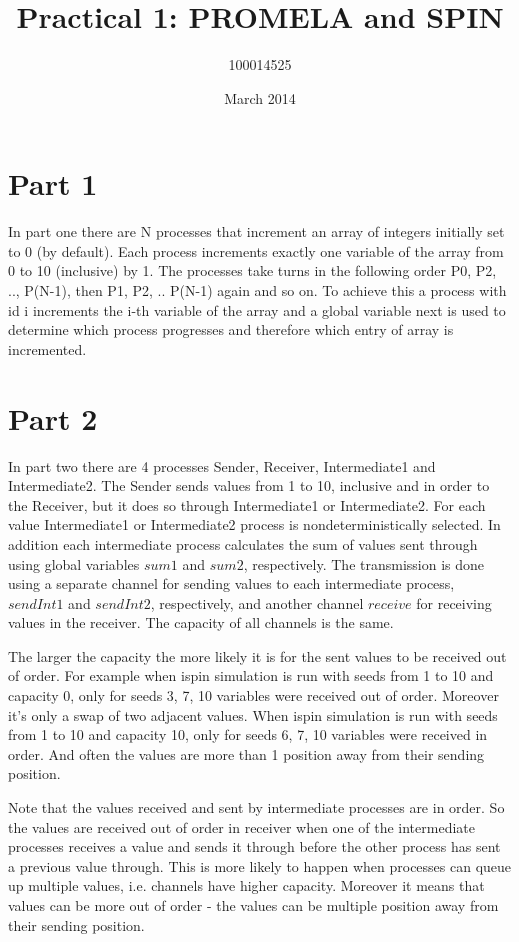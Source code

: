 \documentclass{article}
\title{Practical 1: PROMELA and SPIN}
\author{100014525}
\date{March 2014}
\begin{document}
\maketitle

\section*{Part 1}

In part one there are N processes that increment an array of integers initially set to 0 (by default). Each process increments exactly one variable of the array from 0 to 10 (inclusive) by 1. The processes take turns in the following order P0, P2, .., P(N-1), then P1, P2, .. P(N-1) again and so on. To achieve this a process with id i increments the i-th variable of the array and a global variable next is used to 
determine which process progresses and therefore which entry of array is incremented.

\section*{Part 2}

In part two there are 4 processes Sender, Receiver, Intermediate1 and Intermediate2. The Sender sends values from 1 to 10, inclusive and in order to the Receiver, but it does so through Intermediate1 or Intermediate2. For each value Intermediate1 or Intermediate2 process is nondeterministically selected. In addition each intermediate process calculates the sum of values sent through using global variables $sum1$ and $sum2$, respectively. The transmission is done using a separate channel for sending values to each intermediate process, $sendInt1$ and $sendInt2$, respectively, and another channel $receive$ for receiving values in the receiver. The capacity of all channels is the same.

The larger the capacity the more likely it is for the sent values to be received out of order. For example when ispin simulation is run with seeds from 1 to 10 and capacity 0, only for seeds 3, 7, 10 variables were received out of order. Moreover it's only a swap of two adjacent values. When ispin simulation is run with seeds from 1 to 10 and capacity 10, only for seeds 6, 7, 10 variables were received in order. And often the values are more than 1 position away from their sending position.

Note that the values received and sent by intermediate processes are in order. So the values are received out of order in receiver when one of the intermediate processes receives a value and sends it through before the other process has sent a previous value through. This is more likely to happen when processes can queue up multiple values, i.e. channels have higher capacity. Moreover it means that values can be more out of order - the values can be multiple position away from their sending position.
\end{document}
